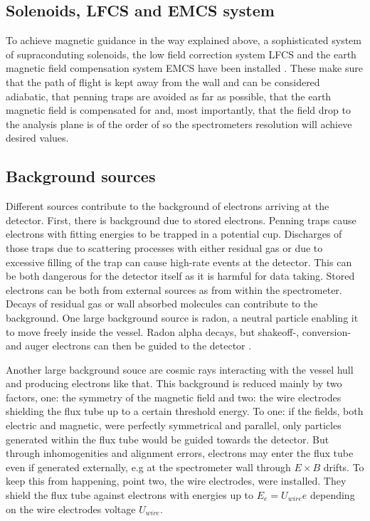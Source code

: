       \subsection{Solenoids, LFCS and EMCS system}
      \label{ch:The KATRIN experiment:sec:Experimental setup:subsec:Solenoids, LFCS and EMCS system}
      
      To achieve magnetic guidance in the way explained above, a sophisticated system of supraconduting solenoids, the low field correction system LFCS and the earth magnetic field compensation system EMCS have been installed \cite{airCoilSystem}. These make sure that the path of flight is kept away from the wall and can be considered adiabatic, that penning traps are avoided as far as possible, that the earth magnetic field is compensated for and, most importantly, that the field drop to the analysis plane is of the order of  so the spectrometers resolution will achieve desired values.
      

      \subsection{Background sources}
      \label{ch:The KATRIN experiment:sec:Experimental setup:subsec:BackgroundSources}
      Different sources contribute to the background of electrons arriving at the detector. First, there is background due to stored electrons. Penning traps cause electrons with fitting energies to be trapped in a potential cup. Discharges of those traps due to scattering processes with either residual gas or due to excessive filling of the trap can cause high-rate events at the detector. This can be both dangerous for the detector itself as it is harmful for data taking. Stored electrons can be both from external sources as from within the spectrometer. Decays of residual gas or wall absorbed molecules can contribute to the background. One large background source is radon, a neutral particle enabling it to move freely inside the vessel. Radon alpha decays, but shakeoff-, conversion- and auger electrons can then be guided to the detector \cite{radonGoerhard}.
      
      Another large background souce are cosmic rays interacting with the vessel hull and producing electrons like that. This background is reduced mainly by two factors, one: the symmetry of the magnetic field and two: the wire electrodes shielding the flux tube up to a certain threshold energy.
      To one: if the fields, both electric and magnetic, were perfectly symmetrical and parallel, only particles generated within the flux tube would be guided towards the detector. But through inhomogenities and alignment errors, electrons may enter the flux tube even if generated externally, e.g at the spectrometer wall through $E\times B$ drifts. To keep this from happening, point two, the wire electrodes, were installed. They shield the flux tube against electrons with energies up to $E_e = U_{wire}e$ depending on the wire electrodes voltage $U_{wire}$. 